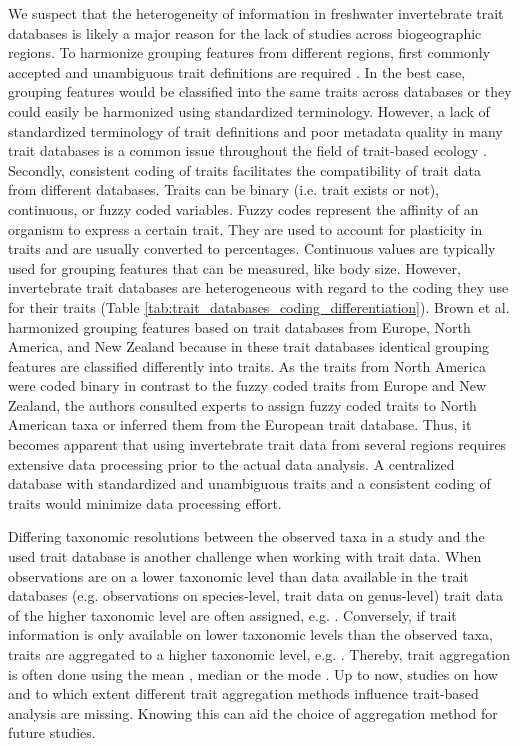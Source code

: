 \documentclass{article}
\begin{document}
We suspect that the heterogeneity of information in freshwater invertebrate trait databases is likely a major reason for the lack of studies across biogeographic regions. To harmonize grouping features from different regions, first commonly accepted and unambiguous trait definitions are required \cite{schneider_towards_2019}. In the best case, grouping features would be classified into the same traits across databases or they could easily be harmonized using standardized terminology. However, a lack of standardized terminology of trait definitions and poor metadata quality in many trait databases is a common issue throughout the field of trait-based ecology \cite{baird_toward_2011, schneider_towards_2019}. Secondly, consistent coding of traits facilitates the compatibility of trait data from different databases. Traits can be binary (i.e. trait exists or not), continuous, or fuzzy coded variables. Fuzzy codes represent the affinity of an organism to express a certain trait. They are used to account for plasticity in traits and are usually converted to percentages. Continuous values are typically used for grouping features that can be measured, like body size. However, invertebrate trait databases are heterogeneous with regard to the coding they use for their traits \cite{culp_incorporating_2011} (Table \ref{tab:trait_databases_coding_differentiation}). Brown et al. \cite{brown_functional_2018} harmonized grouping features based on trait databases from Europe, North America, and New Zealand because in these trait databases identical grouping features are classified differently into traits. As the traits from North America were coded binary in contrast to the fuzzy coded traits from Europe and New Zealand, the authors consulted experts to assign fuzzy coded traits to North American taxa or inferred them from the European trait database. Thus, it becomes apparent that using invertebrate trait data from several regions requires extensive data processing prior to the actual data analysis. A centralized database with standardized and unambiguous traits and a consistent coding of traits would minimize data processing effort.

Differing taxonomic resolutions between the observed taxa in a study and the used trait database is another challenge when working with trait data. When observations are on a lower taxonomic level than data available in the trait databases (e.g. observations on species-level, trait data on genus-level) trait data of the higher taxonomic level are often assigned, e.g. \cite{szocs_effects_2014, vos_taxonomic_2017}. Conversely, if trait information is only available on lower taxonomic levels than the observed taxa, traits are aggregated to a higher taxonomic level, e.g. \cite{poff_functional_2006, szocs_effects_2014, piliere_a._f._h._importance_2016, aspin_extreme_2019}. Thereby, trait aggregation is often done using the mean \cite{magliozzi_functional_2019}, median \cite{szocs_effects_2014} or the mode \cite{piliere_a._f._h._importance_2016}. Up to now, studies on how and to which extent different trait aggregation methods influence trait-based analysis are missing. Knowing this can aid the choice of aggregation method for future studies.
\end{document}
